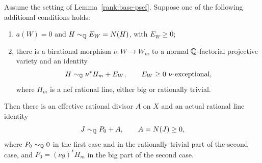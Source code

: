 \begin{lemma}
\label{rank:lift}
Assume the setting of Lemma~\ref{rank:base-psef}.  Suppose one of
the following additional conditions holds:
\begin{enumerate}
\item \(a(W)=0\) and \(H\sim_{\mathbb Q}E_W=N(H)\), with \(E_W\geq0\);
\item there is a birational morphism \(\nu:W\to W_m\) to a normal
\(\mathbb Q\)-factorial projective variety and an identity
\[
              H\sim_{\mathbb Q}\nu^*H_m+E_W,
              \qquad E_W\geq0\ \text{\(\nu\)-exceptional},
\]
where \(H_m\) is a nef rational line, either big or rationally
trivial.
\end{enumerate}
Then there is an effective rational divisor \(A\) on \(X\) and an actual
rational line identity
\begin{equation}
                J\sim_{\mathbb Q}P_0+A,\qquad A=N(J)\geq0,
\label{rank:upstairs-decomposition}
\end{equation}
where \(P_0\sim_{\mathbb Q}0\) in the first case and in the rationally
trivial part of the second case, and
\(P_0=(\nu g)^*H_m\) in the big part of the second case.
\end{lemma}

